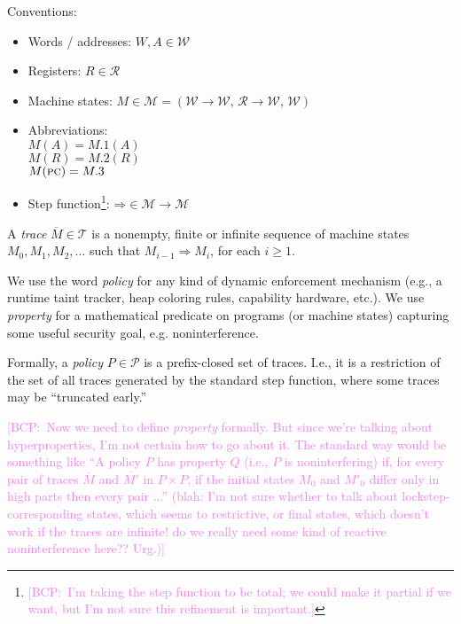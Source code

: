 \documentclass[conference]{IEEEtran}
\newif\ifdraft \drafttrue
\newif\iftext \textfalse
\newcommand{\bcp}[1]{\ifdraft\textcolor{violet}{{[BCP:~#1]}}\fi}
\begin{document}
Conventions:
%
\newcommand{\word}{W}
\newcommand{\addr}{A}
\newcommand{\WORDS}{{\mathcal W}}
\newcommand{\reg}{R}
\newcommand{\REGS}{{\mathcal R}}
\newcommand{\mach}{M}
\newcommand{\MACHS}{{\mathcal M}}
\newcommand{\PC}[1]{\mathit{PC}(#1)}
\newcommand{\pol}{P}
\newcommand{\POLS}{{\mathcal P}}
\newcommand{\trace}[1]{\overline{#1}}
\newcommand{\TRACES}{{\mathcal T}}
\newcommand{\stepsto}{\Rightarrow}
%
\begin{itemize}
\item Words / addresses: $\word,\addr \in \WORDS$
\item Registers: $\reg \in \REGS$
\item Machine states:
$\mach \in \MACHS = (\WORDS\rightarrow\WORDS,\, \REGS\rightarrow\WORDS,\,
\WORDS)$
\item Abbreviations:
\\ $\mach(\addr) = \mach.1(\addr)$
\\ $\mach(\reg) = \mach.2(\reg)$
\\ $\mach(\textsc{pc}) = \mach.3$
\item Step function\footnote{\bcp{I'm taking the step function to be total;
    we could make it partial if we want, but I'm not sure this refinement is
    important.}}: $\mathord{\stepsto} \in \MACHS \rightarrow \MACHS$
\end{itemize}

A {\em trace} $\trace{M} \in \TRACES$ is a nonempty, finite or infinite
sequence of machine states $\mach_0, \mach_1, \mach_2, ...$ such that
$\mach_{i-1} \stepsto \mach_i$, for each $i \geq 1$.

We use the word {\em policy} for any kind of dynamic enforcement
mechanism (e.g., a runtime taint tracker, heap coloring rules, capability
hardware, etc.). We use {\em property} for a mathematical predicate on
programs (or machine states) capturing some useful security goal, e.g. noninterference.

Formally, a {\em policy} $\pol \in \POLS$ is a prefix-closed set of traces.
I.e., it is a restriction of the set of all traces generated by the standard
step function, where some traces may be ``truncated early.''

\iftext \bcp{Not sure we need names for $|TRACES$ or $\POLS$.} \fi

\bcp{Now we need to define {\em property} formally.  But since we're talking
about hyperproperties, I'm not certain how to go about it.  The standard way
would be something like ``A policy $P$ has property $Q$ (i.e., $P$ is
noninterfering) if, for every pair of traces $\trace{M}$ and $\trace{M'}$
in $P \times P$, if the initial states $M_0$ and $M'_0$ differ only in
high parts then every pair ...'' (blah: I'm not sure whether to talk about
lockstep-corresponding states, which seems to restrictive, or final states,
which doesn't work if the traces are infinite!  do we really need some kind
of reactive noninterference here?? Urg.)}
\end{document}
